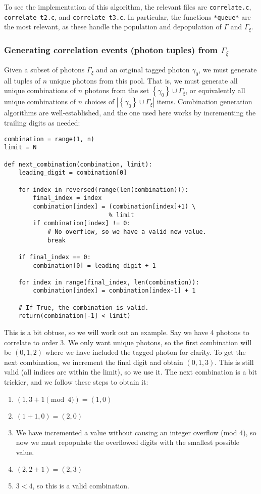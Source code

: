 \documentclass{article}
\newcommand{\braces}[1]{\ensuremath{\left\lbrace #1 \right\rbrace}}
\newcommand{\abs}[1]{\ensuremath{\left|#1\right|}}
\newcommand{\photon}{\ensuremath{\gamma}}
\newcommand{\photons}{\ensuremath{\Gamma}}
\newcommand{\timewindow}{\ensuremath{\xi}}
\begin{document}
To see the implementation of this algorithm, the relevant files are \texttt{correlate.c}, \texttt{correlate\_t2.c}, and \texttt{correlate\_t3.c}. In particular, the functions \texttt{*queue*} are the most relevant, as these handle the population and depopulation of \photons{} and $\photons_{\timewindow}$.

\subsubsection{Generating correlation events (photon tuples) from $\photons_{\timewindow}$}
Given a subset of photons $\photons_{\timewindow}$ and an original tagged photon $\photon_{0}$, we must generate all tuples of $n$ unique photons from this pool. That is, we must generate all unique combinations of $n$ photons from the set $\braces{\photon_{0}}\cup\photons_{\timewindow}$, or equivalently all unique combinations of $n$ choices of  $\abs{\braces{\photon_{0}}\cup\photons_{\timewindow}}$ items. Combination generation algorithms are well-established, and the one used here works by incrementing the trailing digits as needed:
\begin{lstlisting}
combination = range(1, n)
limit = N

def next_combination(combination, limit):
    leading_digit = combination[0]
    
    for index in reversed(range(len(combination))):
        final_index = index
        combination[index] = (combination[index]+1) \
                             % limit
        if combination[index] != 0:
            # No overflow, so we have a valid new value.
            break
    
    if final_index == 0:
        combination[0] = leading_digit + 1
       
    for index in range(final_index, len(combination)):
        combination[index] = combination[index-1] + 1
    
    # If True, the combination is valid. 
    return(combination[-1] < limit) 
\end{lstlisting}
This is a bit obtuse, so we will work out an example. Say we have 4 photons to correlate to order 3. We only want unique photons, so the first combination will be $(0,1,2)$ where we have included the tagged photon for clarity. To get the next combination, we increment the final digit and obtain $(0,1,3)$. This is still valid (all indices are within the limit), so we use it. The next combination is a bit trickier, and we follow these steps to obtain it:
\begin{enumerate}
\item $(1,3+1 \pmod{4}) = (1, 0)$
\item $(1+1, 0) = (2, 0)$
\item We have incremented a value without causing an integer overflow (mod 4), so now we must repopulate the overflowed digits with the smallest possible value.
\item $(2, 2+1) = (2, 3)$
\item $3 < 4$, so this is a valid combination.
\end{enumerate}
\end{document}
